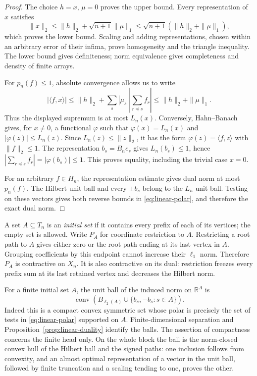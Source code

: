 \begin{proof}
The choice $h=x$, $\mu=0$ proves the upper bound.  Every representation
of $x$ satisfies
\[
 \|x\|_2\le\|h\|_2+\sqrt{n+1}\|\mu\|_1
 \le\sqrt{n+1}(\|h\|_2+\|\mu\|_1),
\]
which proves the lower bound.  Scaling and adding representations,
chosen within an arbitrary error of their infima, prove homogeneity
and the triangle inequality.  The lower bound gives definiteness;
norm equivalence gives completeness and density of finite arrays.

For $p_n(f)\le1$, absolute convergence allows us to write
\[
 |\langle f,x\rangle|
 \le\|h\|_2+
       \sum_s|\mu_s|\left|\sum_{r\preceq s}f_r\right|
 \le\|h\|_2+\|\mu\|_1.
\]
Thus the displayed supremum is at most $L_n(x)$.  Conversely,
Hahn--Banach gives, for $x\ne0$, a functional $\varphi$ such that
$\varphi(x)=L_n(x)$ and $|\varphi(z)|\le L_n(z)$.  Since
$L_n(z)\le\|z\|_2$, it has the form $\varphi(z)=\langle f,z\rangle$
with $\|f\|_2\le1$.  The representation $b_s=B_ne_s$ gives
$L_n(b_s)\le1$, hence
$|\sum_{r\preceq s}f_r|=|\varphi(b_s)|\le1$.  This proves equality,
including the trivial case $x=0$.

For an arbitrary $f\in H_n$, the representation estimate gives dual
norm at most $p_n(f)$.  The Hilbert unit ball and every $\pm b_s$ belong
to the $L_n$ unit ball.  Testing on these vectors gives both reverse
bounds in \eqref{eq:linear-polar}, and therefore the exact dual norm.
\end{proof}

A set $A\subseteq T_n$ is an \emph{initial set} if it contains every
prefix of each of its vertices; the empty set is allowed.  Write $P_A$
for coordinate restriction to $A$.  Restricting a root path to $A$
gives either zero or the root path ending at its last vertex in $A$.
Grouping coefficients by this endpoint cannot increase their
$\ell_1$ norm.  Therefore $P_A$ is contractive on $X_n$.  It is also
contractive on its dual: restriction freezes every prefix sum at its
last retained vertex and decreases the Hilbert norm.

For a finite initial set $A$, the unit ball of the induced norm on
$\mathbb R^A$ is
\begin{equation}
 \operatorname{conv}\left(B_{\ell_2(A)}\cup
                         \{b_s,-b_s:s\in A\}\right).
 \label{eq:linear-finite-ball}
\end{equation}
Indeed this is a compact convex symmetric set whose polar is precisely
the set of tests in \eqref{eq:linear-polar} supported on $A$.
Finite-dimensional separation and Proposition~\ref{prop:linear-duality}
identify the balls.  The assertion of compactness concerns the finite
head only.  On the whole block the ball is the norm-closed convex hull
of the Hilbert ball and the signed paths: one inclusion follows from
convexity, and an almost optimal representation of a vector in the unit
ball, followed by finite truncation and a scaling tending to one,
proves the other.

